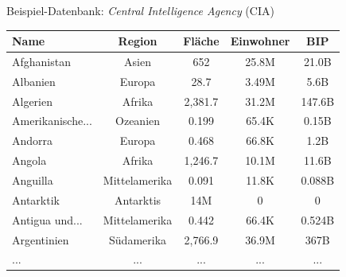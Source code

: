 \begin{frame}[fragile]{Beispiel-Datenbank: \textit{Central Intelligence Agency} (CIA)}
\begin{table}
  \centering
  \tiny
  \begin{tabular}{lcccc}
    \toprule
    \textbf{Name} & \textbf{Region} & \textbf{Fläche} & \textbf{Einwohner} & \textbf{BIP} \\
    \midrule
    Afghanistan & Asien & 652 & 25.8M & 21.0B \\
    Albanien & Europa & 28.7 & 3.49M & 5.6B \\
    Algerien & Afrika & 2,381.7 & 31.2M & 147.6B \\
    Amerikanische... & Ozeanien & 0.199 & 65.4K & 0.15B \\
    Andorra & Europa & 0.468 & 66.8K & 1.2B \\
    Angola & Afrika & 1,246.7 & 10.1M & 11.6B \\
    Anguilla & Mittelamerika & 0.091 & 11.8K & 0.088B \\
    Antarktik & Antarktis & 14M & 0 & 0 \\
    Antigua und... & Mittelamerika & 0.442 & 66.4K & 0.524B \\
    Argentinien & Südamerika & 2,766.9 & 36.9M & 367B \\
    \midrule
    ... & ... & ... & ... & ... \\
    \bottomrule
  \end{tabular}
\end{table}
\end{frame}


\newcommand{\highlightTable}[3]{
\begin{tikzpicture}
  \tikzstyle{cell} = [draw, rectangle, minimum width=1.6cm, minimum height=.6cm, fill=gray!10, rounded corners]
  \tikzstyle{cellcdot} = [draw, rectangle, minimum width=1.6cm, minimum height=.6cm, fill=gray!0, rounded corners]

  \foreach \row in {1,...,6} {
    \foreach \col/\ctitle in {1/\underline{Name},2/Region,3/Fläche,4/Einwohner,5/BIP} {
      \node(\col\row)[cell] at (\col*2, -\row) {
      \ifnum\row=1 
      	\scriptsize\textbf{\ctitle}\normalsize
      \else 
      	$\cdots$ 
      \fi
      };
    }
  }
  \draw[black, thick] (1,-1.5) -- (11,-1.5);
  
  \draw [red,ultra thick,rounded corners]
    (3,-.5) rectangle (5,-6.5);

  \draw [blue,ultra thick,rounded corners]
    (1,-2.5) rectangle (11,-3.5);
    
  \node[above] at (4,-0.5){\textcolor{red}{Spalte \tiny(=Kolonne, Attribut)\normalsize}};
  \node[left] at (1,-3){\textcolor{blue}{Zeile}};
  
  \node(label) at (2,.5) {\small Schlüsselattribut \tiny(eindeutig!)};
  \path[->] (1.5,-1) edge[bend left] node [left] {} (label); 
\end{tikzpicture}
}

